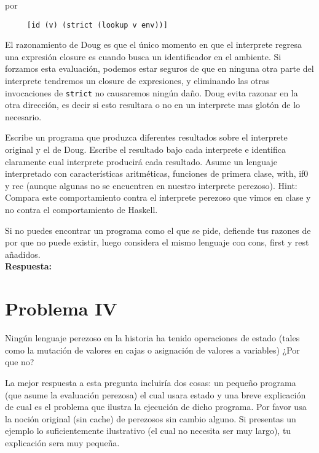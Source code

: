 \documentclass{article}
\begin{document}
por

\begin{verbatim}
     [id (v) (strict (lookup v env))]
\end{verbatim}

El razonamiento de Doug es que el único momento en que el interprete regresa una
expresión closure es cuando busca un identificador en el ambiente. Si forzamos
esta evaluación, podemos estar seguros de que en ninguna otra parte del interprete
tendremos un closure de expresiones, y eliminando las otras invocaciones de
\texttt{strict} no causaremos ningún daño. Doug evita razonar en la otra dirección,
es decir si esto resultara o no en un interprete mas glotón de lo necesario.

Escribe un programa que produzca diferentes resultados sobre el interprete original
y el de Doug. Escribe el resultado bajo cada interprete e identifica claramente
cual interprete producirá cada resultado. Asume un lenguaje interpretado
con características aritméticas, funciones de primera clase, with, if0 y rec
(aunque algunas no se encuentren en nuestro interprete perezoso). Hint: Compara
este comportamiento contra el interprete perezoso que vimos en clase y no contra
el comportamiento de Haskell.

Si no puedes encontrar un programa como el que se pide, defiende tus razones
de por que no puede existir, luego considera el mismo lenguaje con cons, first
y rest añadidos.
\\

\textbf{Respuesta: }



\section*{Problema IV}
Ningún lenguaje perezoso en la historia ha tenido operaciones de estado (tales
como la mutación de valores en cajas o asignación de valores a variables) ¿Por
que no?

La mejor respuesta a esta pregunta incluiría dos cosas: un pequeño programa (que
asume la evaluación perezosa) el cual usara estado y una breve explicación de cual
es el problema que ilustra la ejecución de dicho programa. Por favor usa la
noción original (sin cache) de perezosos sin cambio alguno. Si presentas un
ejemplo lo suficientemente ilustrativo (el cual no necesita ser muy largo), tu
explicación sera muy pequeña.
\end{document}
